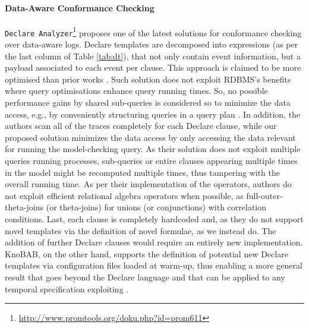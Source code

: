 \paragraph*{Data-Aware Conformance Checking}
\texttt{Declare Analyzer}\footnote{\url{http://www.promtools.org/doku.php?id=prom611}} \cite{BurattinMS16} proposes one of the latest solutions for conformance checking over data-aware logs. Declare templates are decomposed into \LTLf expressions (as per the last column of Table \ref{tab:dt}), that not only contain event information, but a payload associated to each event per clause. 
This approach is claimed to be  more optimised than prior works \cite{VanDerAalst2005}.  
Such solution
does not exploit RDBMS's 
benefits %
where %
query optimisations enhance query running times. 
So, no possible performance gains by shared sub-queries 
is considered so to minimize the data access, e.g., by conveniently 
structuring queries in a query plan \cite{BellatrecheKB21}. 
In addition, the authors
scan all of the traces completely for each Declare clause, while our proposed solution minimizes the data access by only accessing the data relevant for running the model-checking query. 
As their solution does not exploit multiple queries running processes, sub-queries or entire clauses appearing multiple times in the model might be recomputed multiple times, thus tampering with the overall running time.
As per their implementation of the \LTLf operators, authors do not exploit efficient relational algebra operators when possible, as full-outer-theta-joins (or theta-joins) for unions (or conjunctions) with correlation conditions.
%
Last, each clause is completely hardcoded and, as they do not support novel templates via the definition of novel \LTLf formulae, as we instead do. The addition of further Declare clauses would require an entirely new implementation. KnoBAB, on the other hand, supports the definition of potential new Declare templates via configuration files loaded at warm-up, %
thus enabling a more general result that goes beyond the Declare language and that can be applied to any temporal specification exploiting \LTLf.

